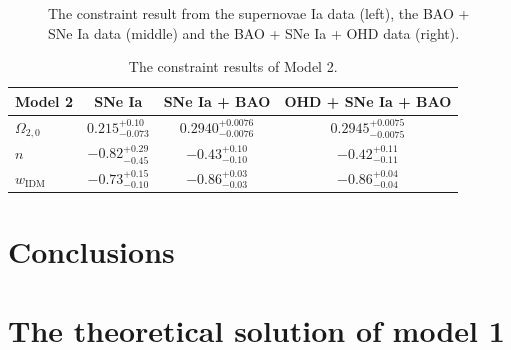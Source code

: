 \documentclass[twocolumn]{aastex631}
\begin{document}
\begin{figure}
{      }
      \caption{The constraint result from the supernovae Ia data
      (left), the BAO + SNe Ia data (middle) and the BAO + SNe Ia + OHD data (right).}
   \end{figure}

   \begin{table}
      \centering
      \begin{tabular}{lccc}
         \hline\hline
         Model 2 & SNe Ia & SNe Ia + BAO
          & OHD + SNe Ia + BAO \\
         \hline
         $\Omega_{2,0}$ & $0.215_{-0.073}^{+0.10}$
          & $0.2940_{-0.0076}^{+0.0076}$ & $0.2945_{-0.0075}^{+0.0075}$ \\
         $n$ & $-0.82_{-0.45}^{+0.29}$
          & $-0.43_{-0.10}^{+0.10}$ & $-0.42_{-0.11}^{+0.11}$ \\
         $w_{\text{IDM}}$ & $-0.73_{-0.10}^{+0.15}$
          & $-0.86_{-0.03}^{+0.03}$ & $-0.86_{-0.04}^{+0.04}$ \\
         \hline
      \end{tabular}
      \caption{The constraint results of Model 2.}
      \label{tab:6}
   \end{table}

\section{Conclusions}

\appendix

\section{The theoretical solution of model 1}
\end{document}
